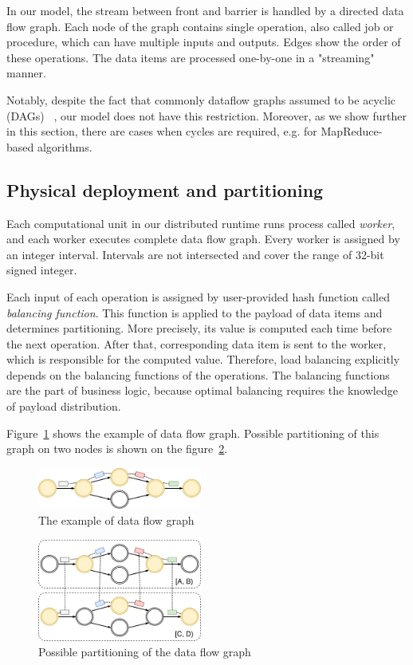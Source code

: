 
\label {fs-graph}

In our model, the stream between front and barrier is handled by a directed data flow graph. Each node of the graph contains single operation, also called job or procedure, which can have multiple inputs and outputs. Edges show the order of these operations. The data items are processed one-by-one in a "streaming" manner.

Notably, despite the fact that commonly dataflow graphs assumed to be acyclic (DAGs) 
~\cite{Zaharia:2016:ASU:3013530.2934664, Carbone:2017:SMA:3137765.3137777},
our model does not have this restriction. Moreover, as we show further in this section, there are cases when cycles are required, e.g. for MapReduce-based algorithms. 

\subsection{Physical deployment and partitioning}

Each computational unit in our distributed runtime runs process called {\it worker}, and each worker executes complete data flow graph. Every worker is assigned by an integer interval. Intervals are not intersected and cover the range of 32-bit signed integer.

Each input of each operation is assigned by user-provided hash function called {\it balancing function}. This function is applied to the payload of data items and determines partitioning. More precisely, its value is computed each time before the next operation. After that, corresponding data item is sent to the worker, which is responsible for the computed value. Therefore, load balancing explicitly depends on the balancing functions of the operations. The balancing functions are the part of business logic, because optimal balancing requires the knowledge of payload distribution.

Figure~\ref{logical-graph-figure} shows the example of data flow graph. Possible partitioning of this graph on two nodes is shown on the figure~\ref{physical-graph-figure}.

\begin{figure}[htbp]
  \centering
  \includegraphics[width=0.48\textwidth]{pics/logical-graph}
  \caption{The example of data flow graph}
  \label {logical-graph-figure}
\end{figure}

\begin{figure}[htbp]
  \centering
  \includegraphics[width=0.48\textwidth]{pics/physical-graph}
  \caption{Possible partitioning of the data flow graph}
  \label {physical-graph-figure}
\end{figure}
